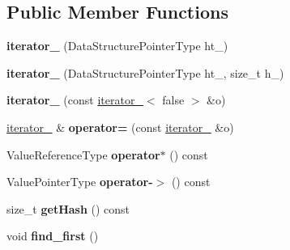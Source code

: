 \subsection*{Public Member Functions}
\begin{DoxyCompactItemize}
\item 
\mbox{\label{classKmerHashTable_1_1iterator___a6d829f925a05ca37fcf448acac14281b}} 
{\bfseries iterator\+\_\+} (Data\+Structure\+Pointer\+Type ht\+\_\+)
\item 
\mbox{\label{classKmerHashTable_1_1iterator___a08459e65a0911bd8a8373b0424590954}} 
{\bfseries iterator\+\_\+} (Data\+Structure\+Pointer\+Type ht\+\_\+, size\+\_\+t h\+\_\+)
\item 
\mbox{\label{classKmerHashTable_1_1iterator___af9dcc07b19a5db25b47c2c2662918a31}} 
{\bfseries iterator\+\_\+} (const \hyperlink{classKmerHashTable_1_1iterator__}{iterator\+\_\+}$<$ false $>$ \&o)
\item 
\mbox{\label{classKmerHashTable_1_1iterator___a59043e2d2a40bce5159eff5f26f134af}} 
\hyperlink{classKmerHashTable_1_1iterator__}{iterator\+\_\+} \& {\bfseries operator=} (const \hyperlink{classKmerHashTable_1_1iterator__}{iterator\+\_\+} \&o)
\item 
\mbox{\label{classKmerHashTable_1_1iterator___a68477ca0a4c1a9f04ea1ffb1e091edf2}} 
Value\+Reference\+Type {\bfseries operator$\ast$} () const
\item 
\mbox{\label{classKmerHashTable_1_1iterator___a648465985ce12907fe78e7b1f6f21b66}} 
Value\+Pointer\+Type {\bfseries operator-\/$>$} () const
\item 
\mbox{\label{classKmerHashTable_1_1iterator___a9a296cb28925af4121950bc42d6c451d}} 
size\+\_\+t {\bfseries get\+Hash} () const
\item 
\mbox{\label{classKmerHashTable_1_1iterator___a5a99e680e2c433dd2965a1b585d27b9f}} 
void {\bfseries find\+\_\+first} ()
\item 

\end{DoxyCompactItemize}
